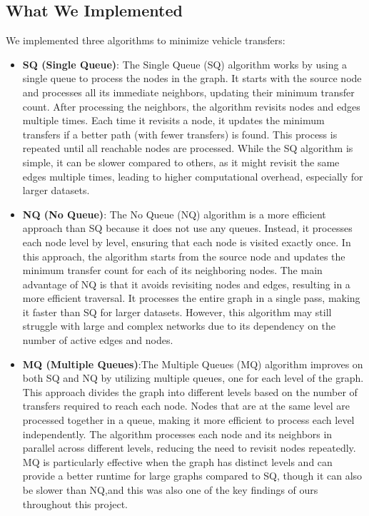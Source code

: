 \documentclass[a4paper,12pt]{article}
\begin{document}
\subsection{What We Implemented}
We implemented three algorithms to minimize vehicle transfers:
\begin{itemize}
    \item \textbf{SQ (Single Queue)}: The Single Queue (SQ) algorithm works by using a single queue to process the nodes in the graph. It starts with the source node and processes all its immediate neighbors, updating their minimum transfer count. After processing the neighbors, the algorithm revisits nodes and edges multiple times. Each time it revisits a node, it updates the minimum transfers if a better path (with fewer transfers) is found. This process is repeated until all reachable nodes are processed. While the SQ algorithm is simple, it can be slower compared to others, as it might revisit the same edges multiple times, leading to higher computational overhead, especially for larger datasets.

    
    \item \textbf{NQ (No Queue)}: The No Queue (NQ) algorithm is a more efficient approach than SQ because it does not use any queues. Instead, it processes each node level by level, ensuring that each node is visited exactly once. In this approach, the algorithm starts from the source node and updates the minimum transfer count for each of its neighboring nodes. The main advantage of NQ is that it avoids revisiting nodes and edges, resulting in a more efficient traversal. It processes the entire graph in a single pass, making it faster than SQ for larger datasets. However, this algorithm may still struggle with large and complex networks due to its dependency on the number of active edges and nodes.
    
    \item \textbf{MQ (Multiple Queues)}:The Multiple Queues (MQ) algorithm improves on both SQ and NQ by utilizing multiple queues, one for each level of the graph. This approach divides the graph into different levels based on the number of transfers required to reach each node. Nodes that are at the same level are processed together in a queue, making it more efficient to process each level independently. The algorithm processes each node and its neighbors in parallel across different levels, reducing the need to revisit nodes repeatedly. MQ is particularly effective when the graph has distinct levels and can provide a better runtime for large graphs compared to SQ, though it can also be slower than NQ,and this was also one of the key findings of ours throughout this project.
\end{itemize}
\end{document}
